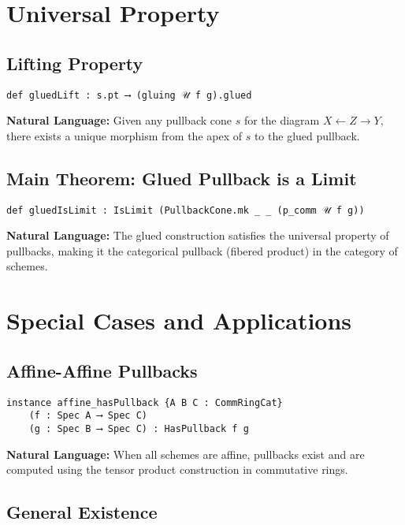 \documentclass{article}
\theoremstyle{definition}
\begin{document}
\section{Universal Property}

\subsection{Lifting Property}

\begin{lstlisting}
def gluedLift : s.pt ⟶ (gluing 𝒰 f g).glued
\end{lstlisting}

\textbf{Natural Language:} Given any pullback cone $s$ for the diagram $X \leftarrow Z \rightarrow Y$, there exists a unique morphism from the apex of $s$ to the glued pullback.

\subsection{Main Theorem: Glued Pullback is a Limit}

\begin{lstlisting}
def gluedIsLimit : IsLimit (PullbackCone.mk _ _ (p_comm 𝒰 f g))
\end{lstlisting}

\textbf{Natural Language:} The glued construction satisfies the universal property of pullbacks, making it the categorical pullback (fibered product) in the category of schemes.

\section{Special Cases and Applications}

\subsection{Affine-Affine Pullbacks}

\begin{lstlisting}
instance affine_hasPullback {A B C : CommRingCat}
    (f : Spec A ⟶ Spec C)
    (g : Spec B ⟶ Spec C) : HasPullback f g
\end{lstlisting}

\textbf{Natural Language:} When all schemes are affine, pullbacks exist and are computed using the tensor product construction in commutative rings.

\subsection{General Existence}
\end{document}

